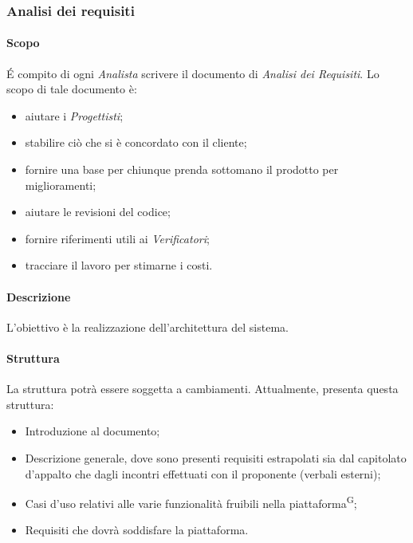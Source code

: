 \subsubsection{Analisi dei requisiti}
\paragraph{Scopo}
\'E compito di ogni \textit{Analista} scrivere il documento di \textit{Analisi dei Requisiti}. Lo scopo di tale documento è:
\begin{itemize}
  \item aiutare i \textit{Progettisti};
  \item stabilire ciò che si è concordato con il cliente;
  \item fornire una base per chiunque prenda sottomano il prodotto per miglioramenti;
  \item aiutare le revisioni del codice;
  \item fornire riferimenti utili ai \textit{Verificatori};
  \item tracciare il lavoro per stimarne i costi.
\end{itemize}

\paragraph{Descrizione}
L’obiettivo è la realizzazione dell’architettura del sistema.

\paragraph{Struttura}
La struttura potrà essere soggetta a cambiamenti. Attualmente, \AdR presenta questa struttura:
\begin{itemize}
  \item Introduzione al documento;
  \item Descrizione generale, dove sono presenti requisiti estrapolati sia dal capitolato d’appalto che dagli incontri effettuati con il proponente (verbali esterni);
  \item Casi d'uso relativi alle varie funzionalità fruibili nella piattaforma\textsuperscript{G};
  \item Requisiti che dovrà soddisfare la piattaforma.
\end{itemize}

